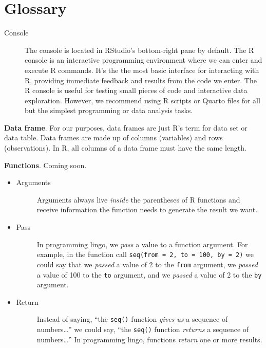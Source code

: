 \documentclass[
  letterpaper,
  DIV=11,
  numbers=noendperiod]{scrreprt}
\begin{document}
\chapter{Glossary}\label{sec-glossary}

\begin{description}
\item[\label{glossary-console}{Console}]
The console is located in RStudio's bottom-right pane by default. The R
console is an interactive programming environment where we can enter and
execute R commands. It's the the most basic interface for interacting
with R, providing immediate feedback and results from the code we enter.
The R console is useful for testing small pieces of code and interactive
data exploration. However, we recommend using R scripts or Quarto files
for all but the simplest programming or data analysis tasks.
\end{description}

\textbf{Data frame}. For our purposes, data frames are just R's term for
data set or data table. Data frames are made up of columns (variables)
and rows (observations). In R, all columns of a data frame must have the
same length.

\textbf{Functions}. Coming soon.

\begin{itemize}
\item
  \begin{description}
  \item[\label{glossary-arguments}{Arguments}]
  Arguments always live \emph{inside} the parentheses of R functions and
  receive information the function needs to generate the result we want.
  \end{description}
\item
  \begin{description}
  \item[\label{glossary-pass}{Pass}]
  In programming lingo, we \emph{pass} a value to a function argument.
  For example, in the function call
  \texttt{seq(from\ =\ 2,\ to\ =\ 100,\ by\ =\ 2)} we could say that we
  \emph{passed} a value of 2 to the \texttt{from} argument, we
  \emph{passed} a value of 100 to the \texttt{to} argument, and we
  \emph{passed} a value of 2 to the \texttt{by} argument.
  \end{description}
\item
  \begin{description}
  \item[\label{glossary-return}{Return}]
  Instead of saying, ``the \texttt{seq()} function \emph{gives us} a
  sequence of numbers\ldots{}'' we could say, ``the \texttt{seq()}
  function \emph{returns} a sequence of numbers\ldots{}'' In programming
  lingo, functions \emph{return} one or more results.
  \end{description}
\end{itemize}
\end{document}
